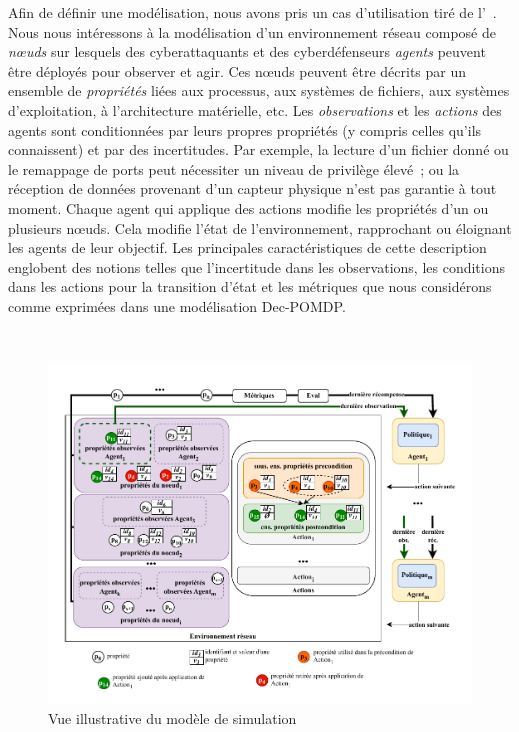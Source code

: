 Afin de définir une modélisation, nous avons pris un cas d'utilisation tiré de l'~\cite{theron_autonomous_2021}. Nous nous intéressons à la modélisation d'un environnement réseau composé de \textit{nœuds} sur lesquels des cyberattaquants et des cyberdéfenseurs \textit{agents} peuvent être déployés pour observer et agir. Ces nœuds peuvent être décrits par un ensemble de \textit{propriétés} liées aux processus, aux systèmes de fichiers, aux systèmes d'exploitation, à l'architecture matérielle, etc.
Les \textit{observations} et les \textit{actions} des agents sont conditionnées par leurs propres propriétés (y compris celles qu'ils connaissent) et par des incertitudes. Par exemple, la lecture d'un fichier donné ou le remappage de ports peut nécessiter un niveau de privilège élevé~; ou la réception de données provenant d'un capteur physique n'est pas garantie à tout moment.
Chaque agent qui applique des actions modifie les propriétés d'un ou plusieurs nœuds. Cela modifie l'état de l'environnement, rapprochant ou éloignant les agents de leur objectif.
Les principales caractéristiques de cette description englobent des notions telles que l'incertitude dans les observations, les conditions dans les actions pour la transition d'état et les métriques que nous considérons comme exprimées dans une modélisation Dec-POMDP.

\

\begin{figure}[]
  \centering
  \includegraphics[trim=0.7cm 0.6cm 0.7cm 1cm, clip,width=1\textwidth]{figures/model_example_illustration.pdf}
  \caption{Vue illustrative du modèle de simulation}
  \label{fig:model_example_illustration}
\end{figure}

